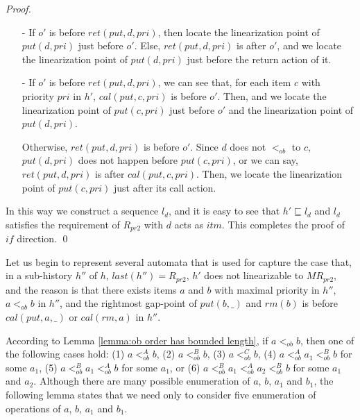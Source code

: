 \documentclass{llncs}
\begin{document}
\begin {proof}
\begin{itemize}
\item[-] If $o'$ is before $\textit{ret}(\textit{put},d,\textit{pri})$, then locate the linearization point of $\textit{put}(d,\textit{pri})$ just before $o'$. Else, $\textit{ret}(\textit{put},d,\textit{pri})$ is after $o'$, and we locate the linearization point of $\textit{put}(d,\textit{pri})$ just before the return action of it.

\item[-] If $o'$ is before $\textit{ret}(\textit{put},d,\textit{pri})$, we can see that, for each item $c$ with priority $\textit{pri}$ in $h'$, $\textit{cal}(\textit{put},c,\textit{pri})$ is before $o'$. Then, and we locate the linearization point of $\textit{put}(c,\textit{pri})$ just before $o'$ and the linearization point of $\textit{put}(d,\textit{pri})$.

    Otherwise, $\textit{ret}(\textit{put},d,\textit{pri})$ is before $o'$. Since $d$ does not $<_{\textit{ob}}$ to $c$, $\textit{put}(d,\textit{pri})$ does not happen before $\textit{put}(c,\textit{pri})$, or we can say, $\textit{ret}(\textit{put},d,\textit{pri})$ is after $\textit{cal}(\textit{put},c,\textit{pri})$. Then, we locate the linearization point of $\textit{put}(c,\textit{pri})$ just after its call action.
\end{itemize}

In this way we construct a sequence $l_d$, and it is easy to see that $h' \sqsubseteq l_d$ and $l_d$ satisfies the requirement of $R_{\textit{pr2}}$ with $d$ acts as $\textit{itm}$. This completes the proof of $\textit{if}$ direction. \qed
\end {proof}

Let us begin to represent several automata that is used for capture the case that, in a sub-history $h''$ of $h$, $\textit{last}(h'') = R_{\textit{pr2}}$, $h'$ does not linearizable to $\textit{MR}_{\textit{pr2}}$, and the reason is that there exists items $a$ and $b$ with maximal priority in $h''$, $a <_{\textit{ob}} b$ in $h''$, and the rightmost gap-point of $\textit{put}(b,\_)$ and $\textit{rm}(b)$ is before $\textit{cal}(\textit{put},a,\_)$ or $\textit{cal}(\textit{rm},a)$ in $h''$.

According to Lemma \ref{lemma:ob order has bounded length}, if $a <_{\textit{ob}} b$, then one of the following cases hold: (1) $a <_{\textit{ob}}^A b$, (2) $a <_{\textit{ob}}^B b$, (3) $a <_{\textit{ob}}^C b$, (4) $a <_{\textit{ob}}^A a_1 <_{\textit{ob}}^B b$ for some $a_1$, (5) $a <_{\textit{ob}}^B a_1 <_{\textit{ob}}^A b$ for some $a_1$, or (6) $a <_{\textit{ob}}^B a_1 <_{\textit{ob}}^A a_2 <_{\textit{ob}}^B b$ for some $a_1$ and $a_2$. Although there are many possible enumeration of $a$, $b$, $a_1$ and $b_1$, the following lemma states that we need only to consider five enumeration of operations of $a$, $b$, $a_1$ and $b_1$.
\end{document}
